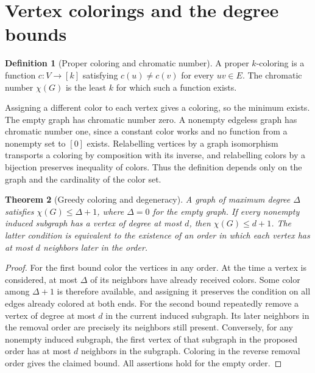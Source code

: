 \documentclass[11pt,oneside,openany]{book}
\theoremstyle{plain}
\newtheorem{theorem}{Theorem}[chapter]
\theoremstyle{definition}
\newtheorem{definition}[theorem]{Definition}
\theoremstyle{remark}
\begin{document}
\section{Vertex colorings and the degree bounds}

\begin{definition}[Proper coloring and chromatic number]\label{p204:W56}
A proper \(k\)-coloring is a function \(c:V\to[k]\) satisfying
\(c(u)\ne c(v)\) for every \(uv\in E\). The chromatic number
\(\chi(G)\) is the least \(k\) for which such a function exists.
\end{definition}

Assigning a different color to each vertex gives a coloring, so the
minimum exists. The empty graph has chromatic number zero. A nonempty
edgeless graph has chromatic number one, since a constant color works
and no function from a nonempty set to \([0]\) exists. Relabelling
vertices by a graph isomorphism transports a coloring by composition
with its inverse, and relabelling colors by a bijection preserves
inequality of colors. Thus the definition depends only on the graph
and the cardinality of the color set.

\begin{theorem}[Greedy coloring and degeneracy]\label{p204:W57}
A graph of maximum degree \(\Delta\) satisfies \(\chi(G)\le\Delta+1\),
where \(\Delta=0\) for the empty graph. If every nonempty induced
subgraph has a vertex of degree at most \(d\), then \(\chi(G)\le d+1\).
The latter condition is equivalent to the existence of an order in
which each vertex has at most \(d\) neighbors later in the order.
\end{theorem}
\begin{proof}
For the first bound color the vertices in any order. At the time a
vertex is considered, at most \(\Delta\) of its neighbors have already
received colors. Some color among \(\Delta+1\) is therefore available,
and assigning it preserves the condition on all edges already colored
at both ends. For the second bound repeatedly remove a vertex of degree
at most \(d\) in the current induced subgraph. Its later neighbors
in the removal order are precisely its neighbors still present.
Conversely, for any nonempty induced subgraph, the first vertex of
that subgraph in the proposed order has at most \(d\) neighbors in
the subgraph. Coloring in the reverse removal order gives the
claimed bound. All assertions hold for the empty order.
\end{proof}
\end{document}
